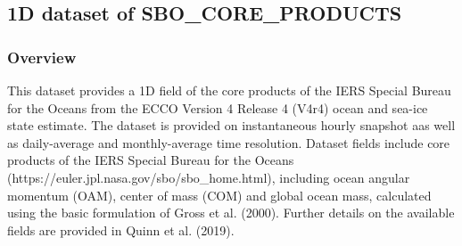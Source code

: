 \subsection{1D dataset of SBO\_CORE\_PRODUCTS}
\newp
\subsubsection{Overview}
This dataset provides a 1D field of the core products of the IERS Special Bureau for the Oceans from the ECCO Version 4 Release 4 (V4r4) ocean and sea-ice state estimate. The dataset is provided on instantaneous hourly snapshot aas well as daily-average and monthly-average time resolution. Dataset fields include core products of the IERS Special Bureau for the Oceans (https://euler.jpl.nasa.gov/sbo/sbo\_home.html), including ocean angular momentum (OAM), center of mass (COM) and global ocean mass, calculated using the basic formulation of Gross et al. (2000). Further details on the available fields are provided in Quinn et al. (2019). 
